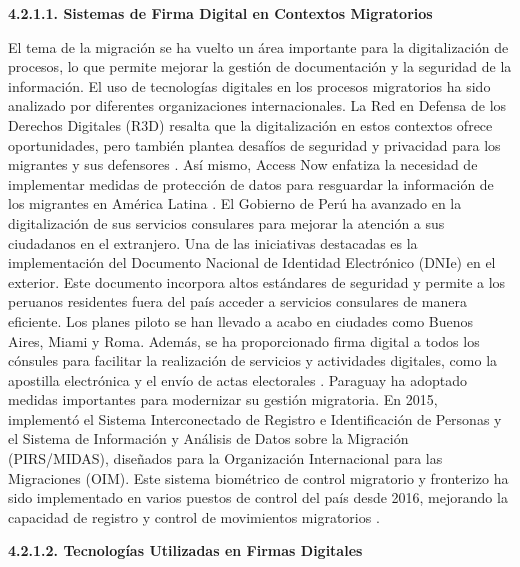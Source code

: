 \documentclass{amsart}
\begin{document}
    
   \textbf{ 4.2.1.1. Sistemas de Firma Digital en Contextos Migratorios }
    
    El tema de la migración se ha vuelto un área importante para la digitalización de procesos, lo que permite mejorar la gestión de documentación y la seguridad de la información. El uso de tecnologías digitales en los procesos migratorios ha sido analizado por diferentes organizaciones internacionales.
    La Red en Defensa de los Derechos Digitales (R3D) resalta que la digitalización en estos contextos ofrece oportunidades, pero también plantea desafíos de seguridad y privacidad para los migrantes y sus defensores \parencite{sanchez}. Así mismo, Access Now enfatiza la necesidad de implementar medidas de protección de datos para resguardar la información de los migrantes en América Latina \parencite{accessnow}.
    El Gobierno de Perú ha avanzado en la digitalización de sus servicios consulares para mejorar la atención a sus ciudadanos en el extranjero. Una de las iniciativas destacadas es la implementación del Documento Nacional de Identidad Electrónico (DNIe) en el exterior. Este documento incorpora altos estándares de seguridad y permite a los peruanos residentes fuera del país acceder a servicios consulares de manera eficiente. Los planes piloto se han llevado a acabo en ciudades como Buenos Aires, Miami y Roma. Además, se ha proporcionado firma digital a todos los cónsules para facilitar la realización de servicios y actividades digitales, como la apostilla electrónica y el envío de actas electorales \parencite{peru}.
    Paraguay ha adoptado medidas importantes para modernizar su gestión migratoria. En 2015, implementó el Sistema Interconectado de Registro e Identificación de Personas y el Sistema de Información y Análisis de Datos sobre la Migración (PIRS/MIDAS), diseñados para la Organización Internacional para las Migraciones (OIM). Este sistema biométrico de control migratorio y fronterizo ha sido implementado en varios puestos de control del país desde 2016, mejorando la capacidad de registro y control de movimientos migratorios \parencite{santi}.
    
    
    \textbf{ 4.2.1.2. Tecnologías Utilizadas en Firmas Digitales }
    
\end{document}
